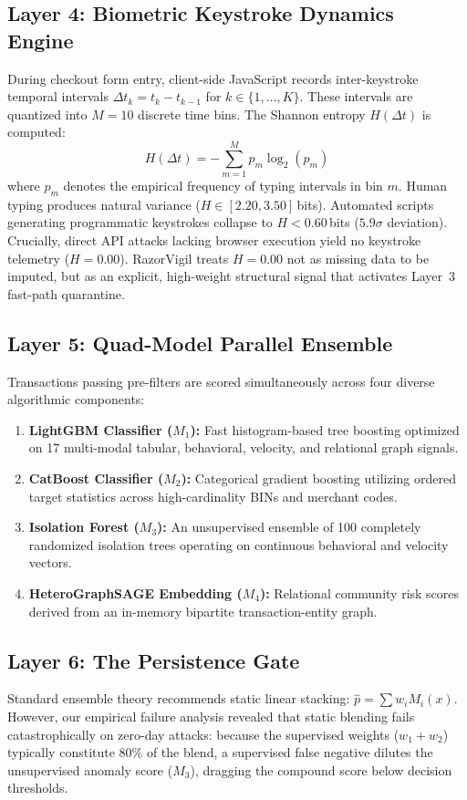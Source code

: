 \documentclass[conference]{IEEEtran}
\begin{document}
\subsection{Layer 4: Biometric Keystroke Dynamics Engine}
During checkout form entry, client-side JavaScript records inter-keystroke temporal intervals $\Delta t_k = t_k - t_{k-1}$ for $k \in \{1, \dots, K\}$. These intervals are quantized into $M = 10$ discrete time bins. The Shannon entropy $H(\Delta t)$ is computed:
\begin{equation}
    H(\Delta t) = -\sum_{m=1}^{M} p_m \log_2(p_m)
    \label{eq:entropy}
\end{equation}
where $p_m$ denotes the empirical frequency of typing intervals in bin $m$. Human typing produces natural variance ($H \in [2.20, 3.50]$\,bits). Automated scripts generating programmatic keystrokes collapse to $H < 0.60$\,bits ($5.9\sigma$ deviation). Crucially, direct API attacks lacking browser execution yield no keystroke telemetry ($H = 0.00$). RazorVigil treats $H = 0.00$ not as missing data to be imputed, but as an explicit, high-weight structural signal that activates Layer~3 fast-path quarantine.

\subsection{Layer 5: Quad-Model Parallel Ensemble}
Transactions passing pre-filters are scored simultaneously across four diverse algorithmic components:
\begin{enumerate}
    \item \textbf{LightGBM Classifier ($M_1$):} Fast histogram-based tree boosting optimized on 17 multi-modal tabular, behavioral, velocity, and relational graph signals.
    \item \textbf{CatBoost Classifier ($M_2$):} Categorical gradient boosting utilizing ordered target statistics across high-cardinality BINs and merchant codes.
    \item \textbf{Isolation Forest ($M_3$):} An unsupervised ensemble of 100 completely randomized isolation trees operating on continuous behavioral and velocity vectors.
    \item \textbf{HeteroGraphSAGE Embedding ($M_4$):} Relational community risk scores derived from an in-memory bipartite transaction-entity graph.
\end{enumerate}

\subsection{Layer 6: The Persistence Gate}
\label{sec:gate_detail}
Standard ensemble theory recommends static linear stacking: $\hat{p} = \sum w_i M_i(x)$. However, our empirical failure analysis revealed that static blending fails catastrophically on zero-day attacks: because the supervised weights ($w_1 + w_2$) typically constitute $80\%$ of the blend, a supervised false negative dilutes the unsupervised anomaly score ($M_3$), dragging the compound score below decision thresholds.
\end{document}
